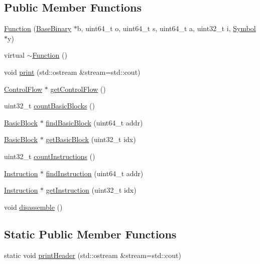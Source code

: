 \subsection*{\-Public \-Member \-Functions}
\begin{DoxyCompactItemize}
\item 
\hyperlink{class_e_p_a_x_1_1_function_ac873403538ebdbf41e3dd50e6717ed8e}{\-Function} (\hyperlink{class_e_p_a_x_1_1_base_binary}{\-Base\-Binary} $\ast$b, uint64\-\_\-t o, uint64\-\_\-t s, uint64\-\_\-t a, uint32\-\_\-t i, \hyperlink{class_e_p_a_x_1_1_symbol}{\-Symbol} $\ast$y)
\item 
virtual \hyperlink{class_e_p_a_x_1_1_function_ab25462d1e27b1619c989c82d8f052b5e}{$\sim$\-Function} ()
\item 
void \hyperlink{class_e_p_a_x_1_1_function_a82cd9c2c9b4210f2c189e60f13445b77}{print} (std\-::ostream \&stream=std\-::cout)
\item 
\hyperlink{class_e_p_a_x_1_1_control_flow}{\-Control\-Flow} $\ast$ \hyperlink{class_e_p_a_x_1_1_function_a21ef5f83eff1f260deea42edd3f9288a}{get\-Control\-Flow} ()
\item 
uint32\-\_\-t \hyperlink{class_e_p_a_x_1_1_function_ab6ab497ee5a9fd8794a6fc007c28322e}{count\-Basic\-Blocks} ()
\item 
\hyperlink{class_e_p_a_x_1_1_basic_block}{\-Basic\-Block} $\ast$ \hyperlink{class_e_p_a_x_1_1_function_affd34e44b8b26be10b2eaeafa90c72e2}{find\-Basic\-Block} (uint64\-\_\-t addr)
\item 
\hyperlink{class_e_p_a_x_1_1_basic_block}{\-Basic\-Block} $\ast$ \hyperlink{class_e_p_a_x_1_1_function_aab41091efc192b4da0912746b4b03c4c}{get\-Basic\-Block} (uint32\-\_\-t idx)
\item 
uint32\-\_\-t \hyperlink{class_e_p_a_x_1_1_function_aa7cf28ca6fd8dda7391a142a3fce6f20}{count\-Instructions} ()
\item 
\hyperlink{class_e_p_a_x_1_1_instruction}{\-Instruction} $\ast$ \hyperlink{class_e_p_a_x_1_1_function_a0d6c6cd2a010690550065de7865591d7}{find\-Instruction} (uint64\-\_\-t addr)
\item 
\hyperlink{class_e_p_a_x_1_1_instruction}{\-Instruction} $\ast$ \hyperlink{class_e_p_a_x_1_1_function_a80400b0ca8d9047bff8dd588d8a03918}{get\-Instruction} (uint32\-\_\-t idx)
\item 
void \hyperlink{class_e_p_a_x_1_1_function_a0388e0d1e3953da9e259711c4352c146}{disassemble} ()
\end{DoxyCompactItemize}
\subsection*{\-Static \-Public \-Member \-Functions}
\begin{DoxyCompactItemize}
\item 
static void \hyperlink{class_e_p_a_x_1_1_function_acf8e6e84f93e87bab13edc2c03929425}{print\-Header} (std\-::ostream \&stream=std\-::cout)
\end{DoxyCompactItemize}


